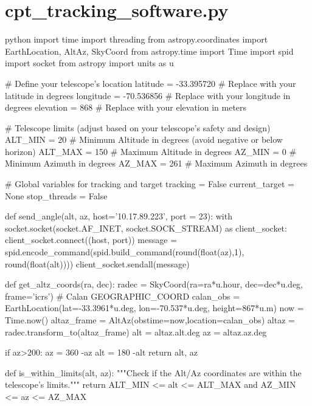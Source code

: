 
\section*{cpt\_tracking\_software.py}

\begin{sourcecode}[]{python}{}
    import time
    import threading
    from astropy.coordinates import EarthLocation, AltAz, SkyCoord
    from astropy.time import Time
    import spid
    import socket
    from astropy import units as u
    
    # Define your telescope's location
    latitude = -33.395720  # Replace with your latitude in degrees
    longitude = -70.536856  # Replace with your longitude in degrees
    elevation = 868  # Replace with your elevation in meters
    
    # Telescope limits (adjust based on your telescope's safety and design)
    ALT_MIN = 20  # Minimum Altitude in degrees (avoid negative or below horizon)
    ALT_MAX = 150  # Maximum Altitude in degrees
    AZ_MIN = 0   # Minimum Azimuth in degrees
    AZ_MAX = 261 # Maximum Azimuth in degrees
    
    # Global variables for tracking and target
    tracking = False
    current_target = None
    stop_threads = False
    
    def send_angle(alt, az, host='10.17.89.223', port = 23):
        with socket.socket(socket.AF_INET, socket.SOCK_STREAM) as client_socket:
            client_socket.connect((host, port))
            message = spid.encode_command(spid.build_command(round(float(az),1), round(float(alt))))
            client_socket.sendall(message)
    
    
    def get_altz_coords(ra, dec):
        radec = SkyCoord(ra=ra*u.hour, dec=dec*u.deg, frame='icrs')
        # Calan GEOGRAPHIC_COORD
        calan_obs = EarthLocation(lat=-33.3961*u.deg, lon=-70.537*u.deg, height=867*u.m)
        now = Time.now()
        altaz_frame = AltAz(obstime=now,location=calan_obs)
        altaz = radec.transform_to(altaz_frame)
        alt = altaz.alt.deg
        az = altaz.az.deg
    
        if az>200:
            az = 360 -az
            alt = 180 -alt
        return alt, az
    
    
    def is_within_limits(alt, az):
        """Check if the Alt/Az coordinates are within the telescope's limits."""
        return ALT_MIN <= alt <= ALT_MAX and AZ_MIN <= az <= AZ_MAX
    

\end{sourcecode}
